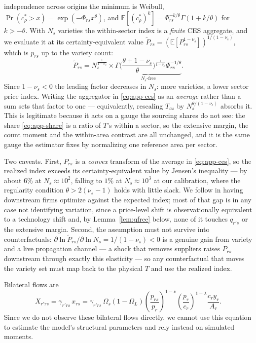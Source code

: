 independence across origins the minimum is Weibull, $\Pr(c^{*}_{\rho}>x)=\exp(-\Phi_{rs}x^{\theta})$,
and $\mathbb{E}[(c^{*}_{\rho})^{k}]=\Phi_{rs}^{-k/\theta}\Gamma(1+k/\theta)$ for $k>-\theta$. With
$N_{s}$ varieties the within-sector index is a \emph{finite} CES aggregate, and we evaluate it at
its certainty-equivalent value $\widetilde P_{rs}=(\mathbb{E}[P_{rs}^{1-\nu_{s}}])^{1/(1-\nu_{s})}$,
which is $p_{rs}$ up to the variety count:
\begin{equation}
\widetilde P_{rs}=N_{s}^{\frac{1}{1-\nu_{s}}}\times
\underbrace{\Gamma\Big(\frac{\theta+1-\nu_{s}}{\theta}\Big)^{\frac{1}{1-\nu_{s}}}\Phi_{rs}^{-1/\theta}}_{N_{s}\text{-free}} .
\label{eq:app-loveofvariety}
\end{equation}
Since $1-\nu_{s}<0$ the leading factor decreases in $N_{s}$: more varieties, a lower sector price
index. Writing the aggregator in \eqref{eq:app-ces} as an \emph{average} rather than a sum sets
that factor to one --- equivalently, rescaling $T_{as}$ by $N_{s}^{\theta/(1-\nu_{s})}$ absorbs
it. This is legitimate because it acts on a gauge the sourcing shares do not see: the share
\eqref{eq:app-share} is a ratio of $T$'s within a sector, so the extensive margin, the count
moment and the within-area contrast are all unchanged, and it is the same gauge the estimator
fixes by normalizing one reference area per sector.

\label{app:model-price}%
Two caveats. First, $P_{rs}$ is a \emph{convex} transform of the average in \eqref{eq:app-ces},
so the realized index exceeds its certainty-equivalent value by Jensen's inequality --- by about
$6\%$ at $N_{s}\approx10^{2}$, falling to $1\%$ at $N_{s}\approx10^{3}$ at our calibration, where
the regularity condition $\theta>2(\nu_{s}-1)$ holds with little slack. We follow
\citet{lmm2023} in having downstream firms optimize against the expected index; most of that gap
is in any case not identifying variation, since a price-level shift is observationally
equivalent to a technology shift and, by Lemma~\ref{lem:qfree} below, none of it touches
$q_{r's}$ or the extensive margin. Second, the assumption must not survive into counterfactuals:
$\partial\ln\widetilde P_{rs}/\partial\ln N_{s}=1/(1-\nu_{s})<0$ is a genuine gain from variety
and a live propagation channel --- a shock that removes suppliers raises $P_{rs}$ downstream
through exactly this elasticity --- so any counterfactual that moves the variety set must map
back to the physical $T$ and use the realized index.

Bilateral flows are
\begin{equation}
X_{r'rs}=\gamma_{r'rs}\,x_{rs}
=\gamma_{r'rs}\,\Omega_{s}(1-\Omega_{L})
\left(\frac{p_{rs}}{p_{r}}\right)^{1-\nu}\left(\frac{p_{r}}{c_{r}}\right)^{1-\lambda}\frac{c_{r}y_{r}}{A_{r}} .
\end{equation}
Since we do not observe these bilateral flows directly, we cannot use this equation to estimate
the model's structural parameters and rely instead on simulated moments.


